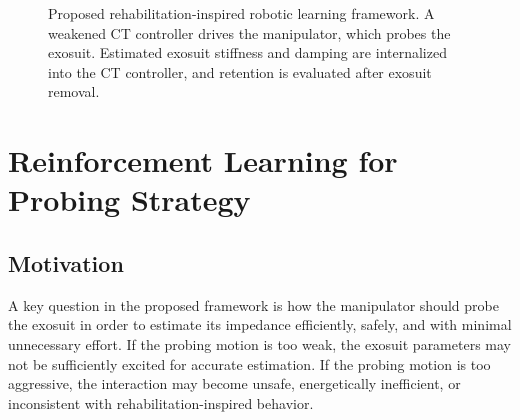 \documentclass[11pt]{article}
\begin{document}
\begin{figure}[t]
\centering
{}
\caption{Proposed rehabilitation-inspired robotic learning framework. A weakened CT controller drives the manipulator, which probes the exosuit. Estimated exosuit stiffness and damping are internalized into the CT controller, and retention is evaluated after exosuit removal.}
\label{fig:framework}
\end{figure}

\section{Reinforcement Learning for Probing Strategy}

\subsection{Motivation}

A key question in the proposed framework is how the manipulator should probe the exosuit in order to estimate its impedance efficiently, safely, and with minimal unnecessary effort. If the probing motion is too weak, the exosuit parameters may not be sufficiently excited for accurate estimation. If the probing motion is too aggressive, the interaction may become unsafe, energetically inefficient, or inconsistent with rehabilitation-inspired behavior.
\end{document}
